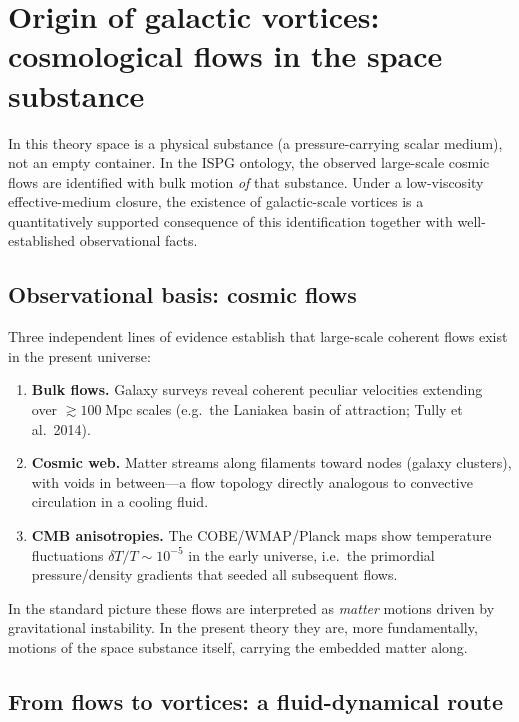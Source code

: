 \documentclass[11pt]{article}
\begin{document}
\section{Origin of galactic vortices: cosmological flows in the space substance}\label{sec:vortex_origin}

In this theory space is a physical substance (a pressure-carrying scalar
medium), not an empty container.  In the ISPG ontology, the observed
large-scale cosmic flows are identified with bulk motion \emph{of} that
substance.  Under a low-viscosity effective-medium closure, the
existence of galactic-scale vortices is a quantitatively supported
consequence of this identification together with well-established
observational facts.

\subsection{Observational basis: cosmic flows}\label{sec:cosmic_flows}

Three independent lines of evidence establish that large-scale coherent
flows exist in the present universe:
\begin{enumerate}
  \item \textbf{Bulk flows.}  Galaxy surveys reveal coherent peculiar
    velocities extending over ${\gtrsim}100\;\mathrm{Mpc}$ scales
    (e.g.\ the Laniakea basin of attraction;
    Tully et al.~2014).
  \item \textbf{Cosmic web.}  Matter streams along filaments toward
    nodes (galaxy clusters), with voids in between---a flow topology
    directly analogous to convective circulation in a cooling fluid.
  \item \textbf{CMB anisotropies.}  The COBE/WMAP/Planck maps show
    temperature fluctuations $\delta T/T \sim 10^{-5}$ in the early
    universe, i.e.\ the primordial pressure/density gradients that
    seeded all subsequent flows.
\end{enumerate}

In the standard picture these flows are interpreted as \emph{matter}
motions driven by gravitational instability.  In the present theory
they are, more fundamentally, motions of the space substance itself,
carrying the embedded matter along.

\subsection{From flows to vortices: a fluid-dynamical route}\label{sec:flows_to_vortices}
\end{document}

